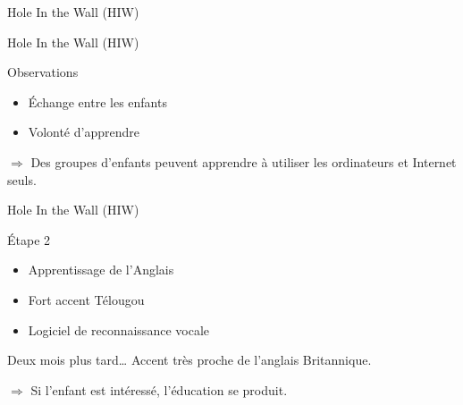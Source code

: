 \begin{frame}{Hole In the Wall (HIW)}

    
\end{frame}

\begin{frame}{Hole In the Wall (HIW)}
  \begin{block}{Observations}
    \begin{itemize}
      \item Échange entre les enfants
      \item Volonté d'apprendre
    \end{itemize}
    $\Rightarrow$ Des groupes d'enfants peuvent apprendre à utiliser les ordinateurs et Internet seuls.
  \end{block}
\end{frame}

\begin{frame}{Hole In the Wall (HIW)}
  \begin{block}{Étape 2}
    \begin{itemize}
      \item Apprentissage de l'Anglais
      \item Fort accent Télougou
      \item Logiciel de reconnaissance vocale
    \end{itemize}
  \end{block}
\pause
  \begin{block}{Deux mois plus tard\ldots}
    Accent très proche de l'anglais Britannique.
    
    $\Rightarrow$ Si l'enfant est intéressé, l'éducation se produit.
  \end{block}
\end{frame}

